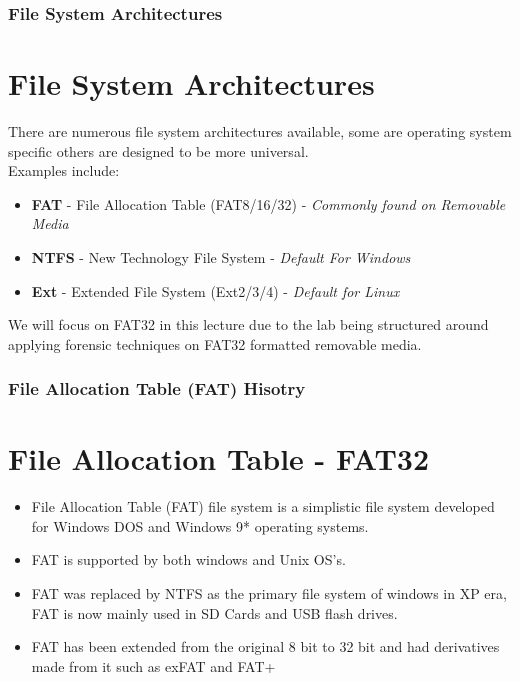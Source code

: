 \documentclass{beamer}
\begin{document}
\begin{frame}
	\frametitle{File System Architectures}
	\section*{File System Architectures}
	There are numerous file system architectures available, some are operating system specific others are designed to be more universal. \\
	\vspace{\baselineskip}
	Examples include:
	\begin{itemize}
		\item \textbf{FAT} - File Allocation Table (FAT8/16/32) - \textit{Commonly found on Removable Media} 
		\item \textbf{NTFS} - New Technology File System - \textit{Default For Windows}
		\item \textbf{Ext} - Extended File System (Ext2/3/4) - \textit{Default for Linux}
	\end{itemize}
		\vspace{\baselineskip}
	We will focus on FAT32 in this lecture due to the lab being structured around applying forensic techniques on FAT32 formatted removable media.
\end{frame}

\begin{frame}
	\frametitle{File Allocation Table (FAT) Hisotry}
	\section*{File Allocation Table - FAT32}
	\begin{itemize}
		\item File Allocation Table (FAT) file system is a simplistic file system developed for Windows DOS and Windows 9* operating systems. 
		\vspace{\baselineskip}
		\item FAT is supported by both windows and Unix OS's. 
		\vspace{\baselineskip}
		\item FAT was replaced by NTFS as the primary file system of windows in XP era, FAT is now mainly used in SD Cards and USB flash drives.
		\vspace{\baselineskip}
		\item FAT has been extended from the original 8 bit to 32 bit and had derivatives made from it such as exFAT and FAT+
	\end{itemize}	
\end{frame}
\end{document}
